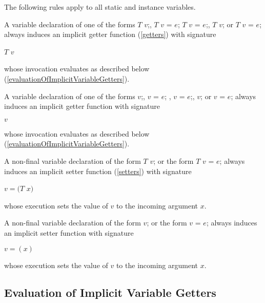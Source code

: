 \documentclass{article}
\newcommand{\code}[1]{{\sf #1}}
\begin{document}
\LMHash{}
The following rules apply to all static and instance variables.

\LMHash{}
A  variable declaration  of one of the forms \code{$T$ $v$;}, \code{$T$ $v$ = $e$;}  \code{\CONST{} $T$ $v$ = $e$;}, \code{\FINAL{} $T$ $v$;} or \code{\FINAL{} $T$ $v$ = $e$;} always induces an implicit  getter function (\ref{getters}) with signature

$T$ \GET{} $v$

whose invocation evaluates as described below (\ref{evaluationOfImplicitVariableGetters}).


\LMHash{}
A  variable declaration  of one of the forms \code{\VAR{} $v$;},  \code{\VAR{} $v$ = $e$;} ,  \code{\CONST{} $v$ = $e$;}, \code{\FINAL{} $v$;} or \code{\FINAL{}  $v$ = $e$;}  always induces an implicit  getter function with signature

 \GET{} $v$

whose  invocation evaluates as described below (\ref{evaluationOfImplicitVariableGetters}).

\LMHash{}
A non-final  variable declaration  of the form \code{{} $T$ $v$;} or the form  \code{$T$ $v$ = $e$;}   always induces an implicit  setter function (\ref{setters}) with signature

 \VOID{} \SET{} $v=(T$ $x)$

whose execution sets the value of $v$ to the incoming argument $x$.

\LMHash{}
A  non-final variable declaration  of the form \code{\VAR{} $v$;} or the form  \code{\VAR{} $v$ = $e$;}   always induces an implicit  setter function with signature

\SET{} $v=(x)$

whose execution sets the value of $v$ to the incoming argument $x$.


\subsection{Evaluation of Implicit  Variable Getters}
\end{document}
